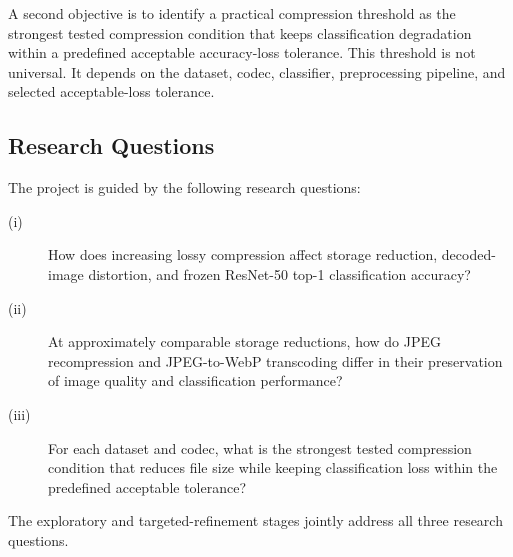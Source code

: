 A second objective is to identify a practical compression threshold as the strongest tested compression condition that keeps classification degradation within a predefined acceptable accuracy-loss tolerance. This threshold is not universal. It depends on the dataset, codec, classifier, preprocessing pipeline, and selected acceptable-loss tolerance.

\subsection{Research Questions}

The project is guided by the following research questions:

\begin{description}
    \item[(i)] How does increasing lossy compression affect storage reduction, decoded-image distortion, and frozen ResNet-50 top-1 classification accuracy?
    \item[(ii)] At approximately comparable storage reductions, how do JPEG recompression and JPEG-to-WebP transcoding differ in their preservation of image quality and classification performance?
    \item[(iii)] For each dataset and codec, what is the strongest tested compression condition that reduces file size while keeping classification loss within the predefined acceptable tolerance?
\end{description}

The exploratory and targeted-refinement stages jointly address all three research questions.
